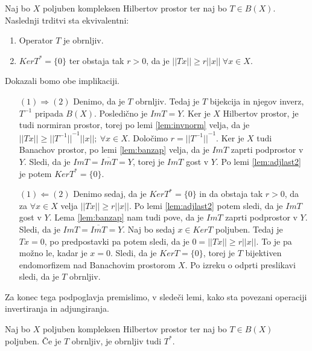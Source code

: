 \documentclass[mat2]{matdelo}
\newcommand{\abs}[1]{\ensuremath{\lvert #1 \rvert}}
\newcommand{\norm}[1]{\abs{\abs{#1}}}
\begin{document}
			\begin{posledica}
				\label{posl:adjinv}
				Naj bo $X$ poljuben kompleksen Hilbertov prostor ter naj bo $T\in B(X)$. Naslednji trditvi sta ekvivalentni: \begin{enumerate}
					\item Operator $T$ je obrnljiv.
					\item $KerT^* = \{0\}$ ter obstaja tak $r > 0$, da je $\norm{Tx} \geq r\norm{x}~\forall x\in X$.
				\end{enumerate}
			\end{posledica}
			
			\begin{dokaz}
				Dokazali bomo obe implikaciji.
				\begin{itemize}
					\item[$(1)\Rightarrow (2)$] Denimo, da je $T$ obrnljiv. Tedaj je $T$ bijekcija in njegov inverz, $T^{-1}$ pripada $B(X)$. Posledično je $ImT = Y$. Ker je $X$ Hilbertov prostor, je tudi normiran prostor, torej po lemi \ref{lem:invnorm} velja, da je $\norm{Tx}\geq \norm{T^{-1}}^{-1}\norm{x};~\forall x\in X$. Določimo $r = \norm{T^{-1}}^{-1}$. Ker je $X$ tudi Banachov prostor, po lemi \ref{lem:banzap} velja, da je $ImT$ zaprti podprostor v $Y$. Sledi, da je $ImT = \overline{ImT} = Y$, torej je $ImT$ gost v $Y$. Po lemi \ref{lem:adjlast2} je potem $KerT^* = \{0\}$.
					\item[$(1)\Leftarrow (2)$] Denimo sedaj, da je $KerT^* = \{0\}$ in da obstaja tak $r>0$, da za $\forall x\in X$ velja $\norm{Tx} \geq r\norm{x}$. Po lemi \ref{lem:adjlast2} potem sledi, da je $ImT$ gost v $Y$. Lema \ref{lem:banzap} nam tudi pove, da je $ImT$ zaprti podprostor v $Y$. Sledi, da je $ImT = \overline{ImT} = Y$.
					Naj bo sedaj $x\in KerT$ poljuben. Tedaj je $Tx = 0$, po predpostavki pa potem sledi, da je $0 = \norm{Tx} \geq r\norm{x}$. To je pa možno le, kadar je $x = 0$. Sledi, da je $KerT = \{0\}$, torej je $T$ bijektiven endomorfizem nad Banachovim prostorom $X$. Po izreku o odprti preslikavi sledi, da je $T$ obrnljiv.
				\end{itemize}
			\end{dokaz}
			Za konec tega podpoglavja premislimo, v sledeči lemi, kako sta povezani operaciji invertiranja in adjungiranja.
			\begin{lema}
				\label{lem:adjinv}
				Naj bo $X$ poljuben kompleksen Hilbertov prostor ter naj bo $T\in B(X)$ poljuben. Če je $T$ obrnljiv, je obrnljiv tudi $T^*$.
			\end{lema}
		
\end{document}
